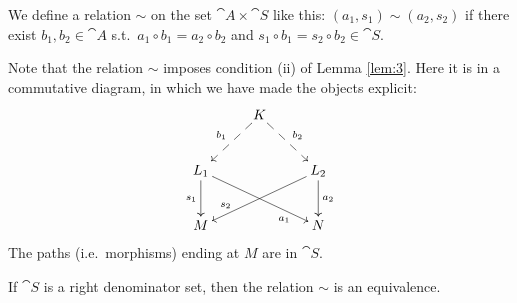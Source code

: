\begin{dfn}  \label{dfn:1408}
We define a relation $\sim$ on the set $\cat{A} \times \cat{S}$
like this:
$(a_1, s_1) \sim (a_2, s_2)$ 
if there exist $b_1, b_2 \in \cat{A}$ s.t.\ 
$a_1 \circ b_1 = a_2 \circ b_2$ 
and
$s_1 \circ b_1 = s_2 \circ b_2 \in \cat{S}$.
\end{dfn}

Note that the relation $\sim$ imposes condition (ii) of Lemma \ref{lem:3}.
Here it is in a commutative diagram, in which we have made the objects explicit:
\begin{equation} \label{eqn:1409}
\UseTips  \xymatrix @C=6ex @R=6ex  {
&
K
\ar@{-->}[dl]_{b_1}
\ar@{-->}[dr]^{b_2}
\\
L_1
\ar[d]_{s_1}
\ar[drr]_(0.75){a_1}
& &
L_2
\ar[dll]_(0.75){s_2}
\ar[d]^{a_2}
\\
M 
& &
N
} 
\end{equation}
The paths (i.e.\ morphisms) ending at $M$ are in $\cat{S}$. 

\begin{lem} \label{lem:4}
If $\cat{S}$ is a right denominator set, then the relation $\sim$ is an 
equivalence.
\end{lem}


